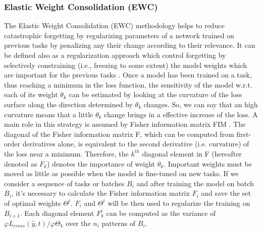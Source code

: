 \documentclass[english, LaM, oneside]{sapthesis}%
\begin{document}
\subsubsection{Elastic Weight Consolidation (EWC)}
The Elastic Weight Consolidation (EWC) methodology helps to reduce catastrophic forgetting by regularizing parameters of a network trained on previous tasks by penalizing any their change according to their relevance. It can be defined also as a regularization approach which  control forgetting by selectively constraining (i.e., freezing to some extent) the model weights which are important for the previous tasks \cite{ewc}. Once a model has been trained on a task, thus reaching a minimum in the loss function, the sensitivity of the model w.r.t. each of its weight $\theta_k$ can be estimated by looking at the curvature of the loss surface along the direction determined by $\theta_k$ changes. So, we can say that an high curvature means that a little $\theta_k$ change brings in a effective increase of the loss. A main role in this strategy is assumed by Fisher information matrix FIM \cite{fisher}. The diagonal of the Fisher information matrix F, which can be computed from first-order derivatives alone, is equivalent to the second derivative (i.e. curvature) of the loss near a minimum. Therefore, the $k^{th}$ diagonal element in F (hereafter denoted as $F_k$) denotes the importance of weight $\theta_k$. Important weights must be moved as little as possible when the model is fine-tuned on new tasks.
\newline \newline
If we consider a sequence of tasks or batches $B_i$ and after training the model on batch $B_i$, it's necessary to calculate the Fisher information matrix $F_i$ and save the set of optimal weights $\Theta^i$. $F_i$ and $\Theta^i$ will be then used to regularize the training on $B_{i+1}$. Each diagonal element $F_k^i$ can be computed as the variance of $\varphi L_{cross}(\hat{y},t)/\varphi \Theta_k$ over the $n_i$ patterns of $B_i$.
\end{document}
